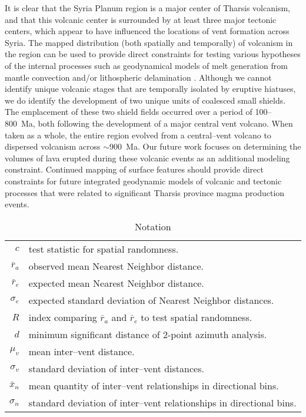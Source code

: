 It is clear that the Syria Planum region is a major center of Tharsis volcanism, and that this volcanic center is surrounded by at least three major tectonic centers, which appear to have influenced the locations of vent formation across Syria. The mapped distribution (both spatially and temporally) of volcanism in the region can be used to provide direct constraints for testing various hypotheses of the internal processes such as geodynamical models of melt generation from mantle convection \citep[e.g.]{ONeill2007} and/or lithospheric delamination \citep[e.g.]{Scott2003}. Although we cannot identify unique volcanic stages that are temporally isolated by eruptive hiatuses, we do identify the development of two unique units of coalesced small shields. The emplacement of these two shield fields occurred over a period of 100--800~Ma, both following the development of a major central vent volcano. When taken as a whole, the entire region evolved from a central--vent volcano to dispersed volcanism across $\sim$900~Ma. Our future work focuses on determining the volumes of lava erupted during these volcanic events as an additional modeling constraint. Continued mapping of surface features should provide direct constraints for future integrated geodynamic models of volcanic and tectonic processes that were related to significant Tharsis province magma production events.

\begin{table}[h]
\caption{Notation}
\centering
\begin{tabular}{r p{7cm}}
\toprule
  $c$&test statistic for spatial randomness.\\
  $\bar{r}_a$&observed mean Nearest Neighbor distance.\\
  $\bar{r}_e$&expected mean Nearest Neighbor distance.\\
  $\sigma_e$&expected standard deviation of Nearest Neighbor distances.\\
  $R$&index comparing $\bar{r}_a$ and $\bar{r}_e$ to test spatial randomness.\\
  $d$&minimum significant distance of 2-point azimuth analysis.\\
  $\mu_v$&mean inter--vent distance.\\
  $\sigma_v$&standard deviation of inter--vent distances.\\
  $\bar{x}_n$&mean quantity of inter--vent relationships in directional bins.\\
  $\sigma_n$&standard deviation of inter--vent relationships in directional bins.\\
\bottomrule
\end{tabular}
\label{tab-notation}
\end{table}

